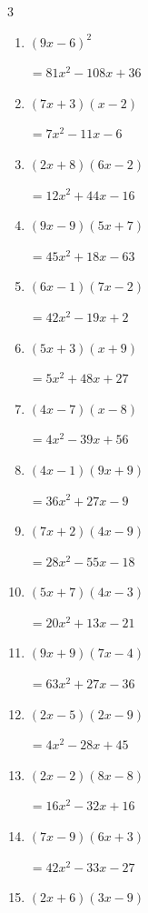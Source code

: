 \begin{multicols}{3}
\begin{enumerate}
        $=21x^{2}+48x-45$

\columnbreak %

  \item $(9x-6)^{2}$

        $=81x^{2}-108x+36$

  \item $(7x+3)(x-2)$

        $=7x^{2}-11x-6$

  \item $(2x+8)(6x-2)$

        $=12x^{2}+44x-16$

  \item $(9x-9)(5x+7)$

        $=45x^{2}+18x-63$

  \item $(6x-1)(7x-2)$

        $=42x^{2}-19x+2$

  \item $(5x+3)(x+9)$

        $=5x^{2}+48x+27$

  \item $(4x-7)(x-8)$

        $=4x^{2}-39x+56$

  \item $(4x-1)(9x+9)$

        $=36x^{2}+27x-9$

  \item $(7x+2)(4x-9)$

        $=28x^{2}-55x-18$

  \item $(5x+7)(4x-3)$

        $=20x^{2}+13x-21$

  \item $(9x+9)(7x-4)$

        $=63x^{2}+27x-36$

  \item $(2x-5)(2x-9)$

        $=4x^{2}-28x+45$

  \item $(2x-2)(8x-8)$

        $=16x^{2}-32x+16$

  \item $(7x-9)(6x+3)$

        $=42x^{2}-33x-27$

  \item $(2x+6)(3x-9)$


\end{enumerate}
\end{multicols}
